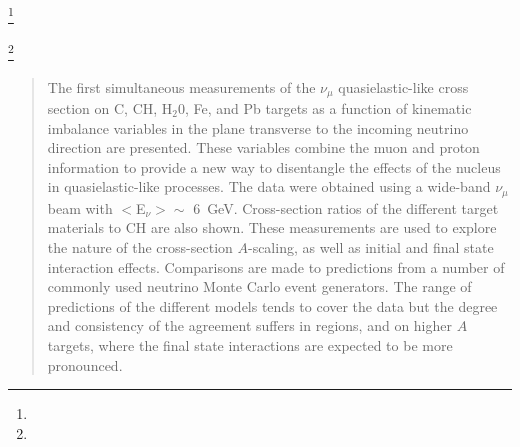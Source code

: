 \documentclass[aps,prd,twocolumn,showpacs,superscriptaddress,floatfix]{revtex4-2}  %
\begin{document}
\author{A.~Olivier}                       \affiliation{\ND}  \affiliation{\Rochester}
\author{V.~Paolone}                       \affiliation{\Pittsburgh}
\author{G.N.~Perdue}                      \affiliation{\FNAL}  \affiliation{\Rochester}
\author{C.~Pernas}                        \affiliation{\WM}
\author{K.-J.~Plows}                      \affiliation{\oxford}
\author{M.A.~Ram\'{i}rez}                 \affiliation{\upenn}  \affiliation{\Guanajuato}
\author{R.D.~Ransome}                     \affiliation{\Rutgers}
\author{N.~Roy}                           \affiliation{\york}
\author{D.~Ruterbories}                   \affiliation{\Rochester}
\author{H.~Schellman}                     \affiliation{\OregonState}
\author{C.~J.~Solano~Salinas}             \affiliation{\UNI}
\author{D.~S.~Correia}                    \affiliation{\CBPF}
\author{M.~Sultana}                       \affiliation{\Rochester}
\author{V.S.~Syrotenko}                   \affiliation{\Tufts}
\author{E.~Valencia}                      \affiliation{\Guanajuato}  \affiliation{\WM}
\author{N.H.~Vaughan}                     \affiliation{\OregonState}
\author{A.V.~Waldron}                     \affiliation{\qmul}  \affiliation{\ICL}
\author{B.~Yaeggy}\thanks{\byaeggyThanks}  \affiliation{\USM}
\author{L.~Zazueta}\thanks{\lazazuetareyesThanks}  \affiliation{\WM}

\noaffiliation

\begin{abstract} 
The first simultaneous measurements of the $\nu_{\mu}$ quasielastic-like cross section on C, CH, H$_2$0, Fe, and Pb targets as a function of kinematic imbalance variables in the plane transverse to the incoming neutrino direction are presented.  These variables combine the muon and proton information to provide a new way to disentangle the effects of the nucleus in quasielastic-like processes.  The data were obtained using a wide-band $\nu_{\mu}$ beam with $<$E$_{\nu}>\sim$ 6~GeV.  Cross-section ratios of the different target materials to CH are also shown.  These measurements are used to explore the nature of the cross-section $A$-scaling, as well as initial and final state interaction effects.  Comparisons are made to predictions from a number of commonly used neutrino Monte Carlo event generators.  The range of predictions of the different models tends to cover the data but the degree and consistency of the agreement suffers in regions, and on higher $A$ targets, where the final state interactions are expected to be more pronounced.

\end{abstract}
\end{document}
